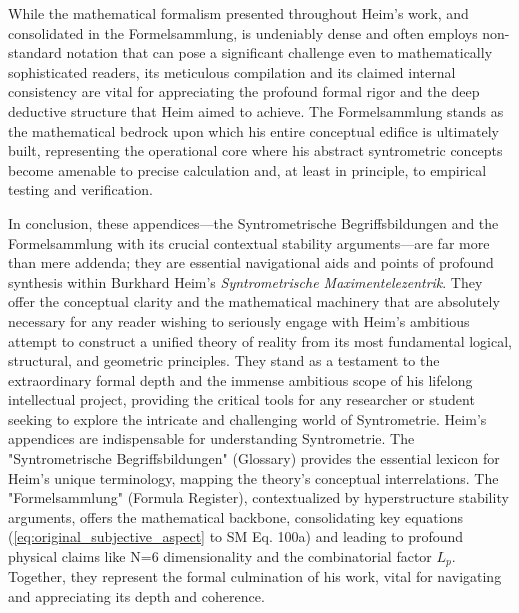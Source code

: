 \documentclass[
    12pt,              %
    a4paper,           %
    headings=normal,   %
    twoside=true,      %
    BCOR=8mm,          %
]{scrbook}
\begin{document}
While the mathematical formalism presented throughout Heim's work, and consolidated in the Formelsammlung, is undeniably dense and often employs non-standard notation that can pose a significant challenge even to mathematically sophisticated readers, its meticulous compilation and its claimed internal consistency are vital for appreciating the profound formal rigor and the deep deductive structure that Heim aimed to achieve. The Formelsammlung stands as the mathematical bedrock upon which his entire conceptual edifice is ultimately built, representing the operational core where his abstract syntrometric concepts become amenable to precise calculation and, at least in principle, to empirical testing and verification.

In conclusion, these appendices—the Syntrometrische Begriffsbildungen and the Formelsammlung with its crucial contextual stability arguments—are far more than mere addenda; they are essential navigational aids and points of profound synthesis within Burkhard Heim's \textit{Syntrometrische Maximentelezentrik}. They offer the conceptual clarity and the mathematical machinery that are absolutely necessary for any reader wishing to seriously engage with Heim's ambitious attempt to construct a unified theory of reality from its most fundamental logical, structural, and geometric principles. They stand as a testament to the extraordinary formal depth and the immense ambitious scope of his lifelong intellectual project, providing the critical tools for any researcher or student seeking to explore the intricate and challenging world of Syntrometrie.
Heim's appendices are indispensable for understanding Syntrometrie. The "Syntrometrische Begriffsbildungen" (Glossary) provides the essential lexicon for Heim's unique terminology, mapping the theory's conceptual interrelations. The "Formelsammlung" (Formula Register), contextualized by hyperstructure stability arguments, offers the mathematical backbone, consolidating key equations (\eqref{eq:original_subjective_aspect} to SM Eq. 100a) and leading to profound physical claims like N=6 dimensionality and the combinatorial factor \(L_p\). Together, they represent the formal culmination of his work, vital for navigating and appreciating its depth and coherence.

\clearpage

\end{document}
